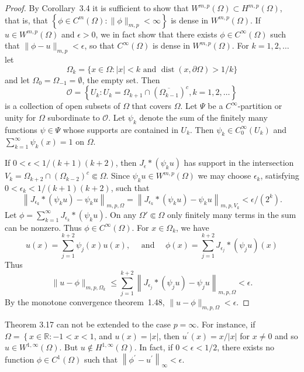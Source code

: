 \begin{proof}
  By Corollary~3.4 it is sufficient to show that $W^{m, p}(\Omega) \subset H^{m, p}(\Omega)$,
  that is, that $\left\{\phi \in C^m(\Omega):\|\phi\|_{m, p}<\infty\right\}$
  is dense in $W^{m, p}(\Omega)$. If $u \in W^{m, p}(\Omega)$ and $\epsilon>0$,
  we in fact show that there exists $\phi \in C^{\infty}(\Omega)$
  such that $\|\phi-u\|_{m, p}<\epsilon$, so that $C^{\infty}(\Omega)$ is dense
  in $W^{m, p}(\Omega)$. For $k=1,2, \ldots$ let
  \[
  \Omega_k=\{x \in \Omega:|x|<k \text { and } \operatorname{dist}(x, \partial\Omega)>1/k\}
  \]
  and let $\Omega_0=\Omega_{-1}=\emptyset$, the empty set. Then
  \[
  \mathscr{O} = \left\{U_k: U_k=\Omega_{k+1} \cap\left(\overline{\Omega_{k-1}}\right)^c, k=1,2, \ldots\right\}
  \]
  is a collection of open subsets of $\Omega$ that covers $\Omega$.
  Let $\Psi$ be a $C^{\infty}$-partition or unity for $\Omega$ subordinate to $\mathscr{O}$.
  Let $\psi_k$ denote the sum of the finitely many functions $\psi \in \Psi$ whose supports are 
  contained in $U_k$.
  Then $\psi_k \in C_0^{\infty}\left(U_k\right)$ and $\sum_{k=1}^{\infty} \psi_k(x)=1$ on $\Omega$.
  
  If $0<\epsilon<1 /(k+1)(k+2)$, then $J_\epsilon *\left(\psi_k u\right)$ has support in the 
  intersection $V_k=\Omega_{k+2} \cap\left(\Omega_{k-2}\right)^c \Subset \Omega$.
  Since $\psi_k u \in W^{m, p}(\Omega)$ we may choose $\epsilon_k$,
  satisfying $0<\epsilon_k<1 /(k+1)(k+2)$, such that
  \[
    \left\|J_{\epsilon_k} *\left(\psi_k u\right)-\psi_k u\right\|_{m, p, \Omega}=\left\|J_{\epsilon_k} *\left(\psi_k u\right)-\psi_k u\right\|_{m, p, V_k}<\epsilon /(2^k) .
  \]
  Let $\phi=\sum_{k=1}^{\infty} J_{\epsilon_k} *\left(\psi_k u\right)$.
  On any $\Omega' \Subset \Omega$ only finitely many terms in the sum can be nonzero.
  Thus $\phi \in C^{\infty}(\Omega)$. For $x \in \Omega_k$, we have
  \[
    u(x)=\sum_{j=1}^{k+2} \psi_j(x) u(x), \quad \text { and } \quad \phi(x)=\sum_{j=1}^{k+2} J_{\epsilon_j} *\left(\psi_j u\right)(x)
  \]
  Thus
  \[
    \|u-\phi\|_{m, p, \Omega_k} \leq \sum_{j=1}^{k+2}\left\|J_{\epsilon_j} *\left(\psi_j u\right)-\psi_j u\right\|_{m, p, \Omega}<\epsilon .
  \]
  By the monotone convergence theorem~1.48, $\|u-\phi\|_{m, p, \Omega}<\epsilon$.
\end{proof}


\begin{example}
  Theorem 3.17 can not be extended to the case $p=\infty$.
  For instance, if $\Omega=\left\{x \in \mathbb{R}:-1<x<1\right.$,
  and $u(x)=|x|$, then $u^{\prime}(x)=x /|x|$ for $x \neq 0$ and so $u \in W^{1, \infty}(\Omega)$. 
  But $u \notin H^{1,\infty}(\Omega)$. In fact, if $0<\epsilon<1 / 2$,
  there exists no function $\phi \in C^1(\Omega)$ such that $\left\|\phi^{\prime}-u^{\prime}\right\|_{\infty}<\epsilon$.
\end{example}


